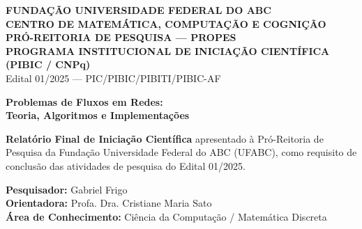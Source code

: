 \documentclass[12pt,a4paper]{article}
\begin{document}
\setlength{\emergencystretch}{3em}
\onehalfspacing

\thispagestyle{empty}

\begin{center}
    {\large\textbf{FUNDAÇÃO UNIVERSIDADE FEDERAL DO ABC}}\\[0.15cm]
    {\large\textbf{CENTRO DE MATEMÁTICA, COMPUTAÇÃO E COGNIÇÃO}}\\[0.15cm]
    {\textbf{PRÓ-REITORIA DE PESQUISA --- PROPES}}\\[0.1cm]
    {\small\textbf{PROGRAMA INSTITUCIONAL DE INICIAÇÃO CIENTÍFICA (PIBIC / CNPq)}}\\[0.1cm]
    {\footnotesize Edital 01/2025 --- PIC/PIBIC/PIBITI/PIBIC-AF}
\end{center}

\vspace{1.0cm}

\begin{center}
    {\LARGE\textbf{Problemas de Fluxos em Redes:}}\\[0.3cm]
    {\Large\textbf{Teoria, Algoritmos e Implementações}}\par
\end{center}

\vspace{0.8cm}

\begin{flushright}
\begin{minipage}{0.6\textwidth}
\small
{}
\textbf{Relatório Final de Iniciação Científica} apresentado à Pró-Reitoria de Pesquisa da Fundação Universidade Federal do ABC (UFABC), como requisito de conclusão das atividades de pesquisa do Edital 01/2025.\par
\vspace{0.3cm}
\textbf{Pesquisador:} Gabriel Frigo\\
\textbf{Orientadora:} Profa. Dra. Cristiane Maria Sato\\
\textbf{Área de Conhecimento:} Ciência da Computação / Matemática Discreta
\end{minipage}
\end{flushright}

\vspace{0.8cm}
\end{document}
